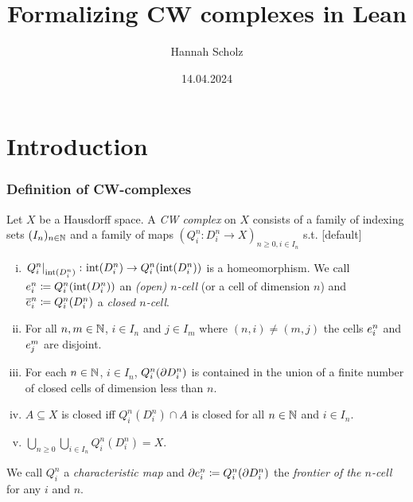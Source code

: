 \documentclass{beamer}
\title{Formalizing CW complexes in Lean}
\author{Hannah Scholz}
\institute[MI]{Mathematical Institute of the University of Bonn}
\date{14.04.2024}
\begin{document}
\frame{\titlepage}

\section{Introduction}

\begin{frame}
\frametitle{Definition of CW-complexes}
\fontsize{10pt}{5}\selectfont
  Let $X$ be a Hausdorff space.
    A \emph{CW complex} on $X$ consists of a family of indexing sets $(I_n)_{n \in \bN}$ and a family of maps $(Q_i^n\colon D_i^n\rightarrow X)_{n \ge 0, i \in I_n}$ s.t.
    [default]
    \begin{enumerate}[(i)]
        \item $\restrict{Q_i^n}{\interior{D_i^n}}\colon \interior{D_i^n} \rightarrow Q_i^n(\interior{D_i^n})$ is a homeomorphism. We call $\openCell{n}{i} \coloneq Q_i^n(\interior{D_i^n})$ an \emph{(open) $n$-cell} (or a cell of dimension $n$)
        and $\closedCell{n}{i} \coloneq Q_i^n(D_i^n)$ a \emph{closed $n$-cell}.
        \item For all $n, m \in \bN$, $i \in I_n$ and $j \in I_m$ where $(n, i) \ne (m, j)$ the cells $\openCell{n}{i}$ and $\openCell{m}{j}$ are disjoint.
        \item For each $n \in \bN$, $i \in I_n$, $Q_i^n(\boundary D_i^n)$ is contained in the union of a finite number of closed cells of dimension less than $n$.
        \item $A \subseteq X$ is closed iff $Q_i^n(D_i^n) \cap A$ is closed for all $n \in \bN$ and $i \in I_n$.
        \item $\bigcup_{n \ge 0}\bigcup_{i \in I_n} Q_i^n(D_i^n) = X$.
    \end{enumerate}
    We call $Q_i^n$ a \emph{characteristic map} and $\cellFrontier{n}{i} \coloneq Q_i^n(\boundary D_i^n)$ the \emph{frontier of the $n$-cell} for any $i$ and $n$.
\end{frame}
\end{document}
